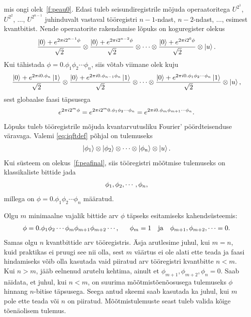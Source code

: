 \documentclass[12pt]{report}
\def\ket#1{\left|#1\right>}
\begin{document}
mis ongi olek~\eqref{f:peau0}.
Edasi tuleb seisundiregistrile mõjuda operaatoritega \(U^{2^1}\), \(U^{2^2}\), \(\ldots\), \(U^{2^{n-1}}\) juhinduvalt vastaval tööregistri \(n-1\)-ndast, \(n-2\)-ndast, \(\ldots\), esimest kvantbitist.
Nende operaatorite rakendamise lõpuks on koguregister olekus
\begin{align}\label{f:peauend}
    \frac{\ket{0}+ e^{2\pi i2^{n-1}\phi}}{\sqrt{2}}
    \otimes \frac{\ket{0}+ e^{2\pi i2^{n-2}\phi}}{\sqrt{2}}
    \otimes\cdots
    \otimes \frac{\ket{0}+ e^{2\pi i2^0\phi}}{\sqrt{2}}
    \otimes\ket{u} \rlap{.}
\end{align}
Kui tähistada \(\phi=0.\phi_1\phi_2\cdots\phi_n\), siis võtab viimane olek kuju
\begin{align}
    \frac{\ket{0}+ e^{2\pi i0.\phi_n}\ket{1}}{\sqrt{2}}
    \otimes \frac{\ket{0}+ e^{2\pi i0.\phi_{n-1}\phi_n}\ket{1}}{\sqrt{2}}
    \otimes\cdots
    \otimes \frac{\ket{0}+ e^{2\pi i0.\phi_1\phi_2\cdots\phi_n}\ket{1}}{\sqrt{2}}
    \otimes\ket{u} \rlap{,}
\end{align}
sest globaalse faasi täpsusega
\begin{align}
    e^{2\pi i2^m\phi}
    = e^{2\pi i2^m 0.\phi_1\phi_2\cdots\phi_n}
    = e^{2\pi i0.\phi_m\phi_{m+1}\cdots\phi_n} \rlap{.}
\end{align}
Lõpuks tuleb tööregistrile mõjuda kvantarvutusliku Fourier' pöördteisenduse väravaga.
Valemi \eqref{eq:iqftdef} põhjal on tulemuseks
\begin{align}\label{f:peafinal}
    \ket{\phi_1} \otimes \ket{\phi_2} \otimes \cdots \otimes \ket{\phi_n} \otimes \ket{u} \rlap{.}
\end{align}
Kui süsteem on olekus~\eqref{f:peafinal}, siis tööregistri mõõtmise tulemuseks on klassikaliste bittide jada
\begin{align}
    \phi_1, \phi_2, \cdots, \phi_n \rlap{,}
\end{align}
millega on \(\phi = 0.\phi_1\phi_2 \cdots \phi_n\) määratud.

Olgu \(m\) minimaalne vajalik bittide arv \(\phi\) täpseks esitamiseks kahendsüsteemis:
\begin{align}
   \phi=0.\phi_1\phi_2\cdots\phi_m\phi_{m+1}\phi_{m+2}\cdots \text{}
   \rlap{,} \qquad \phi_m = 1 \quad\text{ja}\quad \phi_{m+1}, \phi_{m+2}, \cdots = 0 \rlap{.}
\end{align}
Samas olgu \(n\) kvantbittide arv tööregistris.
Äsja arutlesime juhul, kui \(m = n\), kuid praktikas ei pruugi see nii olla, sest \(m\) väärtus ei ole alati ette teada ja faasi hindamiseks võib olla kasutada vaid piiratud arv tööregistri kvantbitte \(n < m\).
Kui \(n > m\), jääb eelnenud arutelu kehtima, ainult et \(\phi_{m+1}, \phi_{m+2}, \phi_n = 0\).
Saab näidata, et juhul, kui \(n < m\), on suurima mõõtmistõenõosusega tulemuseks \(\phi\) hinnang \(n\)-bitise täpsusega.
Seega antud skeemi saab kasutada ka juhul, kui \(m\) pole ette teada või \(n\) on piiratud.
Mõõtmis\-tulemuste seast tuleb valida kõige tõenäolisem tulemus.
\end{document}
